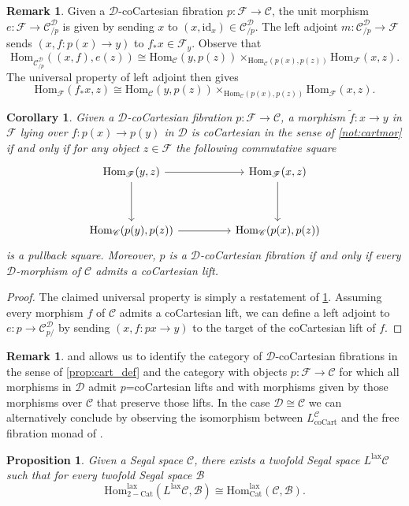 \documentclass[a4paper, reqno]{amsart}
\newtheorem{prop}[theorem]{Proposition}
\newtheorem{cor}[theorem]{Corollary}
\theoremstyle{definition}
\newtheorem{remark}[theorem]{Remark}
\newcommand\cB{\mathscr B}
\newcommand\cC{\mathscr C}
\newcommand\cD{\mathscr D}
\newcommand\cF{\mathscr F}
\newcommand\id{\mathrm{id}}
\newcommand\mor{\mathrm{Hom}}
\newcommand\cat{\mathrm{Cat}}
\newcommand\cart{\mathrm{coCart}}
\newcommand\lax{\mathrm{lax}}
\begin{document}
\begin{remark}\label{rem:cart_univ}
Given a $\cD$-coCartesian fibration $p:\cF\rightarrow\cC$, the unit morphism $e:\cF\rightarrow\cC^\cD_{/p}$ is given by sending $x$ to $(x,\id_x)\in\cC^\cD_{/p}$. The left adjoint $m:\cC^\cD_{/p}\rightarrow \cF$ sends $(x,f:p(x)\rightarrow y)$ to $f_*x\in\cF_y$. Observe that 
\[\mor_{\cC^\cD_{/p}}((x,f),e(z))\cong \mor_\cC(y,p(z))\times_{\mor_\cC(p(x),p(z))}\mor_\cF(x,z).\]
The universal property of left adjoint then gives 
\[\mor_\cF(f_*x,z)\cong \mor_\cC(y,p(z))\times_{\mor_\cC(p(x),p(z))}\mor_\cF(x,z).\]
\end{remark}
\begin{cor}\label{cor:cartlift}
Given a $\cD$-coCartesian fibration $p:\cF\rightarrow\cC$, a morphism $\widetilde{f}:x\rightarrow y$ in $\cF$ lying over $f:p(x)\rightarrow p(y)$ in $\cD$ is coCartesian in the sense of \cref{not:cartmor} if and only if for any object $z\in\cF$ the following commutative square
\[
\begin{tikzcd}[column sep=huge, row sep=huge]
    \mor_{\cF}(y,z)\arrow[r]\arrow[d]&\mor_{\cF}(x,z)\arrow[d]\\
    \mor_{\cC}(p(y),p(z))\arrow[r]& \mor_{\cC}(p(x),p(z))
\end{tikzcd}
\]
is a pullback square. Moreover, $p$ is a $\cD$-coCartesian fibration if and only if every $\cD$-morphism of $\cC$ admits a coCartesian lift.
\end{cor}
\begin{proof}
The claimed universal property is simply a restatement of \cref{rem:cart_univ}. Assuming every morphism $f$ of $\cC$ admits a coCartesian lift, we can define a left adjoint to $e:p\rightarrow\cC^\cD_{p/}$ by sending $(x, f:px\rightarrow y)$ to the target of the coCartesian lift of $f$.
\end{proof}
\begin{remark}
 and \cite[Proposition 2.4.4.3.]{lurie2009higher} allows us to identify the category of $\cD$-coCartesian fibrations in the sense of \cref{prop:cart_def} and the category with objects $p:\cF\rightarrow\cC$ for which all morphisms in $\cD$ admit $p$=coCartesian lifts and with morphisms given by those morphisms over $\cC$ that preserve those lifts. In the case $\cD\cong\cC$ we can alternatively conclude by observing the isomorphism between $L^\cC_{\cart}$ and the free fibration monad of \cite{gepner2015lax}.
\end{remark}
\begin{prop}\label{prop:lax}
Given a Segal space $\cC$, there exists a twofold Segal space $L^\lax\cC$ such that for every twofold Segal space $\cB$
\[\mor^\lax_{2-\cat}(L^\lax\cC,\cB)\cong \mor_\cat^\lax(\cC,\cB).\]
\end{prop}
\end{document}
